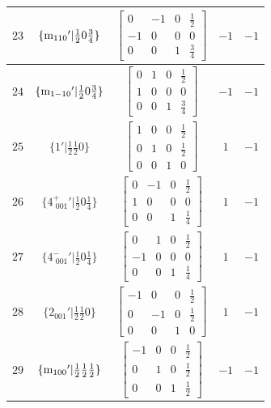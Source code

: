 \documentclass[fleqn,8pt]{jsarticle}
\begin{document}
\begin{longtable}{ccccc}
$ 23 $ & $ \{{\rm m}_{110}{}'|\frac{1}{2} 0 \frac{3}{4}\} $ & $ \begin{bmatrix} 0 & -1 & 0 & \frac{1}{2} \\ -1 & 0 & 0 & 0 \\ 0 & 0 & 1 & \frac{3}{4} \end{bmatrix} $ & $ -1 $ & $ -1 $ \\ \hline
$ 24 $ & $ \{{\rm m}_{1-10}{}'|\frac{1}{2} 0 \frac{3}{4}\} $ & $ \begin{bmatrix} 0 & 1 & 0 & \frac{1}{2} \\ 1 & 0 & 0 & 0 \\ 0 & 0 & 1 & \frac{3}{4} \end{bmatrix} $ & $ -1 $ & $ -1 $ \\ \hline
$ 25 $ & $ \{1{}'|\frac{1}{2} \frac{1}{2} 0\} $ & $ \begin{bmatrix} 1 & 0 & 0 & \frac{1}{2} \\ 0 & 1 & 0 & \frac{1}{2} \\ 0 & 0 & 1 & 0 \end{bmatrix} $ & $ 1 $ & $ -1 $ \\ \hline
$ 26 $ & $ \{4^{+}_{\,\,001}{}'|\frac{1}{2} 0 \frac{1}{4}\} $ & $ \begin{bmatrix} 0 & -1 & 0 & \frac{1}{2} \\ 1 & 0 & 0 & 0 \\ 0 & 0 & 1 & \frac{1}{4} \end{bmatrix} $ & $ 1 $ & $ -1 $ \\ \hline
$ 27 $ & $ \{4^{-}_{\,\,001}{}'|\frac{1}{2} 0 \frac{1}{4}\} $ & $ \begin{bmatrix} 0 & 1 & 0 & \frac{1}{2} \\ -1 & 0 & 0 & 0 \\ 0 & 0 & 1 & \frac{1}{4} \end{bmatrix} $ & $ 1 $ & $ -1 $ \\ \hline
$ 28 $ & $ \{2{}_{001}{}'|\frac{1}{2} \frac{1}{2} 0\} $ & $ \begin{bmatrix} -1 & 0 & 0 & \frac{1}{2} \\ 0 & -1 & 0 & \frac{1}{2} \\ 0 & 0 & 1 & 0 \end{bmatrix} $ & $ 1 $ & $ -1 $ \\ \hline
$ 29 $ & $ \{{\rm m}_{100}{}'|\frac{1}{2} \frac{1}{2} \frac{1}{2}\} $ & $ \begin{bmatrix} -1 & 0 & 0 & \frac{1}{2} \\ 0 & 1 & 0 & \frac{1}{2} \\ 0 & 0 & 1 & \frac{1}{2} \end{bmatrix} $ & $ -1 $ & $ -1 $ \\ \hline

\end{longtable}
\end{document}
